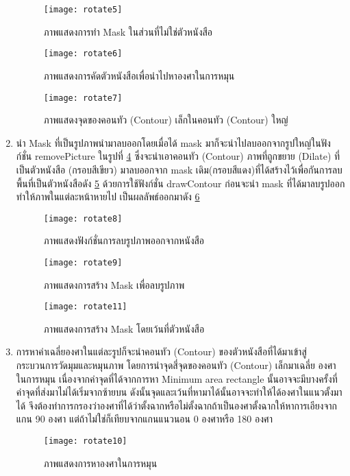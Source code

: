 \begin{enumerate}
    \begin{figure}[H]
        \centering
        \texttt{[image: rotate5]}
        \caption{ภาพแสดงการทำ Mask ในส่วนที่ไม่ใช่ตัวหนังสือ}\label{fig:rotate5}
    \end{figure}

    \begin{figure}[H]
        \centering
        \texttt{[image: rotate6]}
        \caption{ภาพแสดงการคัดตัวหนังสือเพื่อนำไปหาองศาในการหมุน}\label{fig:rotate6}
    \end{figure}

    \begin{figure}[H]
        \centering
        \texttt{[image: rotate7]}
        \caption{ภาพแสดงจุดของคอนทัว (Contour) เล็กในคอนทัว (Contour) ใหญ่}\label{fig:rotate7}
    \end{figure}

    \item นำ Mask ที่เป็นรูปภาพนำมาลบออกโดยเมื่อได้ mask มาก็จะนำไปลบออกจากรูปใหญ่ในฟังก์ชั่น removePicture ในรูปที่ \ref{fig:rotate8}  ซึ่งจะนำเอาคอนทัว (Contour) ภาพที่ถูกขยาย (Dilate) ที่เป็นตัวหนังสือ (กรอบสีเขียว) มาลบออกจาก mask เดิม(กรอบสีแดง)ที่ได้สร้างไว้เพื่อกันการลบพื้นที่เป็นตัวหนังสือดัง \ref{fig:rotate9} ด้วยการใช้ฟังก์ชั่น drawContour ก่อนจะนำ mask ที่ได้มาลบรูปออกทำให้ภาพในแต่ละหน้าหายไป เป็นผลลัพธ์ออกมาดัง \ref{fig:rotate11}
    
    \begin{figure}[H]
        \centering
        \texttt{[image: rotate8]}
        \caption{ภาพแสดงฟังก์ชั่นการลบรูปภาพออกจากหนังสือ}\label{fig:rotate8}
    \end{figure}

    \begin{figure}[H]
        \centering
        \texttt{[image: rotate9]}
        \caption{ภาพแสดงการสร้าง Mask เพื่อลบรูปภาพ}\label{fig:rotate9}
    \end{figure}

    \begin{figure}[H]
        \centering
        \texttt{[image: rotate11]}
        \caption{ภาพแสดงการสร้าง Mask โดยเว้นที่ตัวหนังสือ}\label{fig:rotate11}
    \end{figure}

    \item การหาค่าเฉลี่ยองศาในแต่ละรูปก็จะนำคอนทัว (Contour) ของตัวหนังสือที่ได้มาเข้าสู่กระบวนการวัดมุมและหมุนภาพ โดยการนำจุดสี่จุดของคอนทัว (Contour) เล็กมาเฉลี่ย องศาในการหมุน เนื่องจากค่าจุดที่ได้จากการหา Minimum area rectangle นั้นอาจจะมีบางครั้งที่ค่าจุดที่ส่งมาไม่ได้เริ่มจากซ้ายบน ดังนั้นจุดและเว้นที่หามาได้นั้นอาจจะทำให้ได้องศาในแนวตั้งมาได้ จึงต้องทำการกรองว่าองศาที่ได้ว่าตั้งฉากหรือไม่ตั้งฉากถ้าเป็นองศาตั้งฉากให้หาการเอียงจากแกน 90 องศา แต่ถ้าไม่ใช่ก็เทียบจากแกนแนวนอน 0 องศาหรือ 180 องศา

    \begin{figure}[H]
        \centering
        \texttt{[image: rotate10]}
        \caption{ภาพแสดงการหาองศาในการหมุน}\label{fig:rotate10}
    \end{figure}
    
\end{enumerate}

